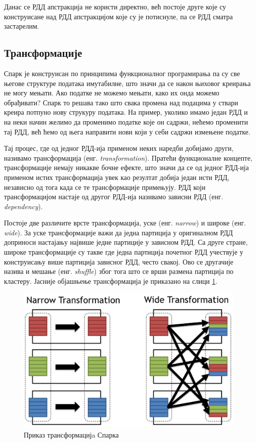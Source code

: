 \documentclass[12pt,oneside]{memoir}
\begin{document}
Данас се РДД апстракција не користи директно, већ постоје друге које су конструисане над РДД апстракцијом које су је потиснуле, па се РДД сматра застарелим.

\subsection{Трансформације}
\label{subsec:spark_transf}

Спарк је конструисан по принципима функционалног програмирања па су све његове структуре података имутабилне, што значи да се након њиховог креирања не могу мењати. Ако податке не можемо мењати, како их онда можемо обрађивати? Спарк то решава тако што свака промена над подацима у ствари креира потпуно нову струкуру података. На пример, уколико имамо један РДД и на неки начин желимо да променимо податке које он садржи, нећемо променити тај РДД, већ ћемо од њега направити нови који у себи садржи измењене податке. \cite{spark_guide}

Тај процес, где од једног РДД-ија применом неких наредби добијамо други, називамо трансформација (енг. \textit{transformation}). Пратећи функционалне концепте, трансформације немају никакве бочне ефекте, што значи да се од једног РДД-ија применом истих трансформација увек као резултат добија један исти РДД, независно од тога када се те трансформације примењују. РДД који трансформацијом настаје од другог РДД-ија називамо зависни РДД (енг. \textit{dependency}). \cite{spark_guide}

Постоје две различите врсте трансформација, уске (енг. \textit{narrow}) и широке (енг. \textit{wide}). За уске трансформације важи да једна партиција у оригиналном РДД доприноси настајању највише једне партиције у зависном РДД. Са друге стране, широке трансформације су такве где једна партиција почетног РДД учествује у конструисању више партиција зависног РДД, често свакој. Ово се другачије назива и мешање (енг. \textit{shuffle}) због тога што се врши размена партиција по кластеру. Јасније објашњење трансформација је приказано на слици \ref{fig:sprk_trnsf}. \cite{spark_guide}

\begin{figure}[!ht]
  \centering
  \includegraphics[width=1\textwidth]{pictures/spark_transformation_types.png}
  \caption{Приказ трансформацијa Спарка}
  \label{fig:sprk_trnsf}
\end{figure}
\end{document}
